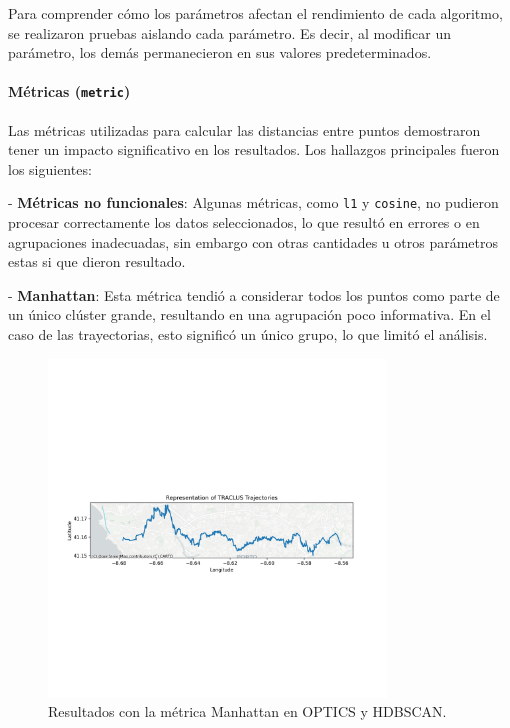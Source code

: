 Para comprender cómo los parámetros afectan el rendimiento de cada algoritmo, se realizaron pruebas aislando cada parámetro. Es decir, al modificar un parámetro, los demás permanecieron en sus valores predeterminados.

\paragraph{Métricas (\texttt{metric})}

Las métricas utilizadas para calcular las distancias entre puntos demostraron tener un impacto significativo en los resultados. Los hallazgos principales fueron los siguientes:

- \textbf{Métricas no funcionales}: Algunas métricas, como \texttt{l1} y \texttt{cosine}, no pudieron procesar correctamente los datos seleccionados, lo que resultó en errores o en agrupaciones inadecuadas, sin embargo con otras cantidades u otros parámetros estas si que dieron resultado.

- \textbf{Manhattan}: Esta métrica tendió a considerar todos los puntos como parte de un único clúster grande, resultando en una agrupación poco informativa. En el caso de las trayectorias, esto significó un único grupo, lo que limitó el análisis.

\begin{figure}[h!]
    \centering
    \includegraphics[width=0.8\textwidth]{img/Taxis/map_optics_manhatan.png}
    \caption{Resultados con la métrica Manhattan en OPTICS y HDBSCAN.}
    \label{fig:manhattan}
\end{figure}

